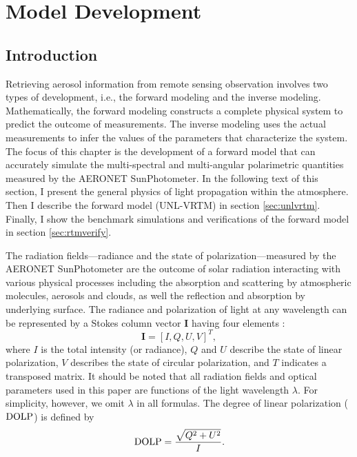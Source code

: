 \chapter{Model Development} \label{ch:model}

\section{Introduction}

Retrieving aerosol information from remote sensing observation
involves two types of development, i.e., the forward modeling and the inverse
modeling. Mathematically, the forward modeling constructs a complete
physical system to predict the outcome of measurements. The inverse
modeling uses the actual measurements to infer the values of the
parameters that characterize the system. The focus of this chapter is
the development of a forward model that can accurately simulate the
multi-spectral and multi-angular polarimetric quantities measured by the
AERONET SunPhotometer. In the following text of this section, I present 
the general physics of light propagation within the atmosphere. 
Then I describe the forward model (UNL-VRTM) in section
\ref{sec:unlvrtm}. Finally, I show the benchmark simulations and verifications 
of the forward model in section \ref{sec:rtmverify}.

The radiation fields---radiance and the state of polarization---measured by the
AERONET SunPhotometer are the outcome of solar radiation interacting
with various physical processes including the absorption and
scattering by atmospheric molecules, aerosols and clouds, as well the
reflection and absorption by underlying surface. 
The radiance and polarization of light at any wavelength can be represented by
a Stokes column vector $\mathbf{I}$ having four elements \citep{Hansen74}:
\begin{equation}
\mathbf{I} = [I,Q,U,V]^T,
\end{equation}
where $I$ is the total intensity (or radiance), $Q$ and $U$ describe the state of
linear polarization, $V$ describes the state of circular polarization, and $T$
indicates a transposed matrix. It should be noted that all radiation fields and
optical parameters used in this paper are functions of the light wavelength
$\lambda$. For simplicity, however, we omit $\lambda$ in all formulas. 
The degree of linear polarization ($\text{DOLP}$) is defined by
\begin{equation}
\text{DOLP} = \frac{\sqrt{Q^2+U^2}}{I}. \label{eq:dolp}
\end{equation}

